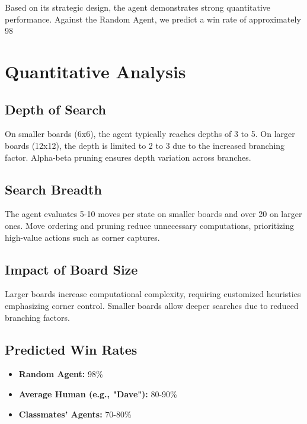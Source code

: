 \documentclass[11pt]{article}
\begin{document}
Based on its strategic design, the agent demonstrates strong quantitative performance. Against the Random Agent, we predict a win rate of approximately 98%

\section*{Quantitative Analysis}
\subsection*{Depth of Search}
On smaller boards (6x6), the agent typically reaches depths of 3 to 5. On larger boards (12x12), the depth is limited to 2 to 3 due to the increased branching factor. Alpha-beta pruning ensures depth variation across branches.

\subsection*{Search Breadth}
The agent evaluates 5-10 moves per state on smaller boards and over 20 on larger ones. Move ordering and pruning reduce unnecessary computations, prioritizing high-value actions such as corner captures.

\subsection*{Impact of Board Size}
Larger boards increase computational complexity, requiring customized heuristics emphasizing corner control. Smaller boards allow deeper searches due to reduced branching factors.

\subsection*{Predicted Win Rates}
\begin{itemize}
    \item \textbf{Random Agent:} 98\%
    \item \textbf{Average Human (e.g., "Dave"):} 80-90\%
    \item \textbf{Classmates' Agents:} 70-80\%
\end{itemize}
\end{document}
